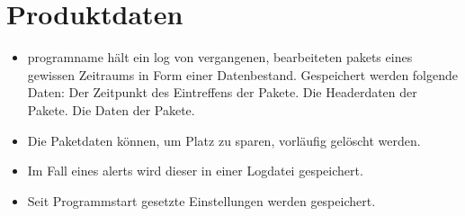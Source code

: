 \chapter{Produktdaten}


\begin{itemize}
  \item \gls{programname} hält ein \gls{log} von vergangenen, bearbeiteten \glspl{paket} eines gewissen Zeitraums in Form einer Datenbestand. Gespeichert werden folgende Daten:
    \subitem Der Zeitpunkt des Eintreffens der Pakete.
    \subitem Die Headerdaten der Pakete.
    \subitem Die Daten der Pakete.
  \item Die Paketdaten können, um Platz zu sparen, vorläufig gelöscht werden.
  \item Im Fall eines \glspl{alert} wird dieser in einer Logdatei gespeichert.
  \item Seit Programmstart gesetzte Einstellungen werden gespeichert.
\end{itemize}
